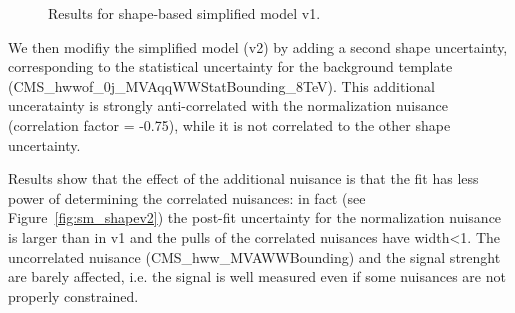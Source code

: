 \begin{figure}[!hbtp]
\caption{Results for shape-based simplified model v1.}
\label{fig:sm_shapev1}
\end{figure}

We then modifiy the simplified model (v2) by adding a second shape uncertainty, corresponding to the statistical uncertainty for 
the background template (CMS\_hwwof\_0j\_MVAqqWWStatBounding\_8TeV). This additional unceratainty is strongly anti-correlated with the
normalization nuisance (correlation factor = -0.75), while it is not correlated to the other shape uncertainty.

Results show that the effect of the additional nuisance is that the fit has less power of determining the correlated nuisances: 
in fact (see Figure~\ref{fig:sm_shapev2}) the post-fit uncertainty for the normalization nuisance is larger than in v1 and the pulls of the
correlated nuisances have width<1. 
The uncorrelated nuisance (CMS\_hww\_MVAWWBounding) and the signal strenght are barely affected, 
i.e. the signal is well measured even if some nuisances are not properly constrained.

